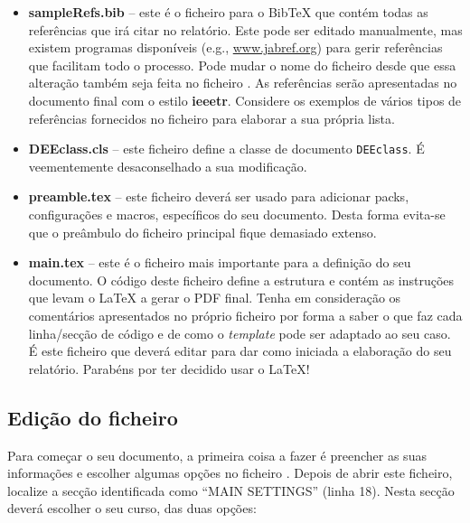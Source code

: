\begin{itemize}
\item \textbf{sampleRefs.bib} -- este é o ficheiro para o BibTeX que contém todas as referências que irá citar no relatório. Este pode ser editado manualmente, mas existem programas disponíveis (e.g., \url{www.jabref.org}) para gerir referências que facilitam todo o processo. Pode mudar o nome do ficheiro desde que essa alteração também seja feita no ficheiro . As referências serão apresentadas no documento final com o estilo \textbf{ieeetr}. Considere os exemplos de vários tipos de referências fornecidos no ficheiro  para elaborar a sua própria lista.

\item \textbf{DEEclass.cls} -- este ficheiro define a classe de documento \verb|DEEclass|. É veementemente desaconselhado a sua modificação.

\item \textbf{preamble.tex} -- este ficheiro deverá ser usado para adicionar \glspl{pack}, configurações e macros, específicos do seu documento. Desta forma evita-se que o preâmbulo do ficheiro principal  fique demasiado extenso. 

\item \textbf{main.tex} -- este é o ficheiro mais importante para a definição do seu documento. O código deste ficheiro define a estrutura e contém as instruções que levam o \LaTeX{} a gerar o PDF final. Tenha em consideração os comentários apresentados no próprio ficheiro por forma a saber o que faz cada linha/secção de código e de como o \textit{template} pode ser adaptado ao seu caso. É este ficheiro que deverá editar para dar como iniciada a elaboração do seu relatório. Parabéns por ter decidido usar o \LaTeX{}!
\end{itemize}


\subsection{Edição do ficheiro }
\label{subsec:Ch2.2.3}

Para começar o seu documento, a primeira coisa a fazer é preencher as suas informações e escolher algumas opções no ficheiro . Depois de abrir este ficheiro, localize a secção identificada como ``MAIN SETTINGS'' (linha 18). Nesta secção deverá escolher o seu curso, das duas opções:

